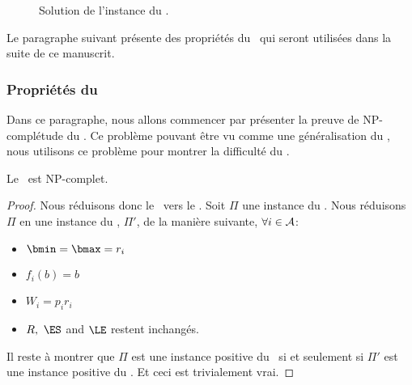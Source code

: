 \begin{ex}
\begin{figure}[!htb]
\centering
{}
\caption{Solution de l'instance du \CECSP.}
\label{sol_ex_CECSP}
\end{figure}
\end{ex}

Le paragraphe suivant présente des propriétés du \CECSP~qui seront 
utilisées dans la suite de ce manuscrit. 

\subsubsection{Propriétés du \CECSP}

Dans ce paragraphe, nous allons commencer par présenter la preuve de
NP-complétude du \CECSP. Ce problème pouvant être vu comme une
généralisation du \CUSP, nous utilisons ce problème pour montrer la
difficulté du \CECSP. 

\begin{theo}
Le \CECSP~est NP-complet.
\end{theo}

\begin{proof}
Nous réduisons donc le \CUSP~vers le \CECSP. Soit $\Pi$ une instance
du \CUSP. Nous réduisons $\Pi$ en une instance du \CECSP, $\Pi'$, de
la manière suivante, $\forall i \in {\cal A}$:
\begin{itemize}
\item $ \bmin=\bmax=r_i$
\item $f_i(b)=b$
\item $W_i=p_ir_i$
\item $R,\ \ES$ and $\LE$ restent inchangés. 
\end{itemize}

Il reste à montrer que $\Pi$ est une instance positive du \CUSP~si
et seulement si $\Pi'$ est une instance positive du \CECSP. Et ceci
est trivialement vrai. 
\end{proof}

